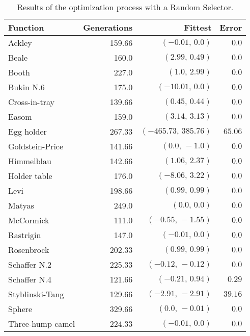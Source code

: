     \begin{table}[H]
      \centering
      \begin{tabular}{|l|r|r|r|}
        \hline
        Function  & Generations & Fittest 
          & Error \\
        \hline\hline
        Ackley	& 159.66	& \((-0.01,\, 0.0)\)	& \(0.0\)\\\hline
        Beale	& 160.0	& \((2.99,\, 0.49)\)	& \(0.0\)\\\hline
        Booth	& 227.0	& \((1.0,\, 2.99)\)	& \(0.0\)\\\hline
        Bukin N.6	& 175.0	& \((-10.01,\, 0.0)\)	& \(0.0\)\\\hline
        Cross-in-tray	& 139.66	& \((0.45,\, 0.44)\)	& \(0.0\)\\\hline
        Easom	& 159.0	& \((3.14,\, 3.13)\)	& \(0.0\)\\\hline
        Egg holder	& 267.33	& \((-465.73,\, 385.76)\)	& \(65.06\)\\\hline
        Goldstein-Price	& 141.66	& \((0.0,\, -1.0)\)	& \(0.0\)\\\hline
        Himmelblau	& 142.66	& \((1.06,\, 2.37)\)	& \(0.0\)\\\hline
        Holder table	& 176.0	& \((-8.06,\, 3.22)\)	& \(0.0\)\\\hline
        Levi	& 198.66	& \((0.99,\, 0.99)\)	& \(0.0\)\\\hline
        Matyas	& 249.0	& \((0.0,\, 0.0)\)	& \(0.0\)\\\hline
        McCormick	& 111.0	& \((-0.55,\, -1.55)\)	& \(0.0\)\\\hline
        Rastrigin	& 147.0	& \((-0.01,\, 0.0)\)	& \(0.0\)\\\hline
        Rosenbrock	& 202.33	& \((0.99,\, 0.99)\)	& \(0.0\)\\\hline
        Schaffer N.2	& 225.33	& \((-0.12,\, -0.12)\)	& \(0.0\)\\\hline
        Schaffer N.4	& 121.66	& \((-0.21,\, 0.94)\)	& \(0.29\)\\\hline
        Styblinski-Tang	& 129.66	& \((-2.91,\, -2.91)\)	& \(39.16\)\\\hline
        Sphere	& 329.66	& \((0.0,\, -0.01)\)	& \(0.0\)\\\hline
        Three-hump camel	& 224.33	& \((-0.01,\, 0.0)\)	& \(0.0\)\\\hline
      \end{tabular}
      \caption{Results of the optimization process with a Random Selector.}
    \end{table}


